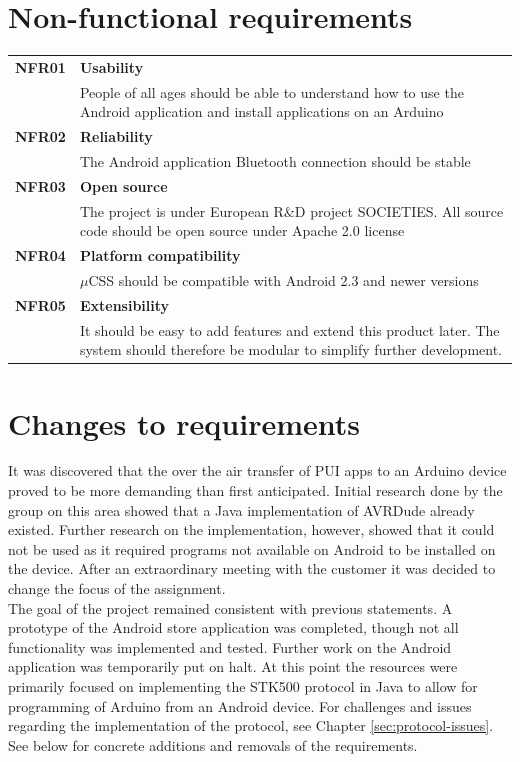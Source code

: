 \section{Non-functional requirements}
\label{non-functional}
	\begin{table}[H]
	\begin{tabularx}{\linewidth}{lX}
		\textbf{NFR01} & \textbf{Usability}\\
		 & People of all ages should be able to understand how to use the Android application and install applications on an Arduino\\
		\textbf{NFR02} & \textbf{Reliability}\\
		 & The Android application  Bluetooth connection should be stable\\
		\textbf{NFR03} & \textbf{Open source}\\
		 & The project is under European R\&D project SOCIETIES. All source code should be open source under Apache 2.0 license\\
		\textbf{NFR04} & \textbf{Platform compatibility}\\
		 & $\mu$CSS should be compatible with Android 2.3 and newer versions\\
		\textbf{NFR05} & \textbf{Extensibility}\\
		 & It should be easy to add features and extend this product later. The system should therefore be modular to simplify further development.\\
	\end{tabularx}
	\end{table}

\section{Changes to requirements}\label{sec:changestoreq}
It was discovered that the over the air transfer of PUI apps to an Arduino device proved to be more demanding than first anticipated. Initial research done by the group on this area showed that a Java implementation of AVRDude already existed. Further research on the implementation, however, showed that it could not be used as it required programs not available on Android to be installed on the device. After an extraordinary meeting with the customer it was decided to change the focus of the assignment.\\
\newline
The goal of the project remained consistent with previous statements. A prototype of the Android store application was completed, though not all functionality was implemented and tested. Further work on the Android application was temporarily put on halt. At this point the resources were primarily focused on implementing the STK500 protocol in Java to allow for programming of Arduino from an Android device. For challenges and issues regarding the implementation of the protocol, see Chapter \ref{sec:protocol-issues}. See below for concrete additions and removals of the requirements.

